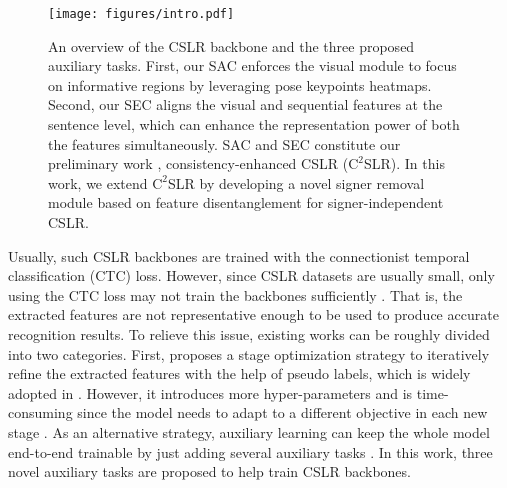 \documentclass[acmsmall,screen]{acmart}
\begin{document}
\begin{figure}[t]
  \centering
   \texttt{[image: figures/intro.pdf]}
   \caption{An overview of the CSLR backbone and the three proposed auxiliary tasks. First, our SAC enforces the visual module to focus on informative regions by leveraging pose keypoints heatmaps. Second, our SEC aligns the visual and sequential features at the sentence level, which can enhance the representation power of both the features simultaneously. SAC and SEC constitute our preliminary work \cite{zuo2022c2slr}, consistency-enhanced CSLR ($\text{C}^2$SLR). In this work, we extend $\text{C}^2$SLR by developing a novel signer removal module based on feature disentanglement for signer-independent CSLR.}
   \label{fig:intro}
\end{figure}

Usually, such CSLR backbones are trained with the connectionist temporal classification (CTC) \cite{ctc} loss.
However, since CSLR datasets are usually small, only using the CTC loss may not train the backbones sufficiently \cite{iopt, dnf, cma, stmc, self-mutual, fcn, vac}.
That is, the extracted features are not representative enough to be used to produce accurate recognition results.
To relieve this issue, existing works can be roughly divided into two categories.
First, \cite{dnf} proposes a stage optimization strategy to iteratively refine the extracted features with the help of pseudo labels, which is widely adopted in \cite{dilated, iopt, cma, stmc, self-mutual}.
However, it introduces more hyper-parameters and is time-consuming since the model needs to adapt to a different objective in each new stage \cite{fcn}.
As an alternative strategy, auxiliary learning can keep the whole model end-to-end trainable by just adding several auxiliary tasks \cite{fcn, vac}.
In this work, three novel auxiliary tasks are proposed to help train CSLR backbones.
\end{document}
